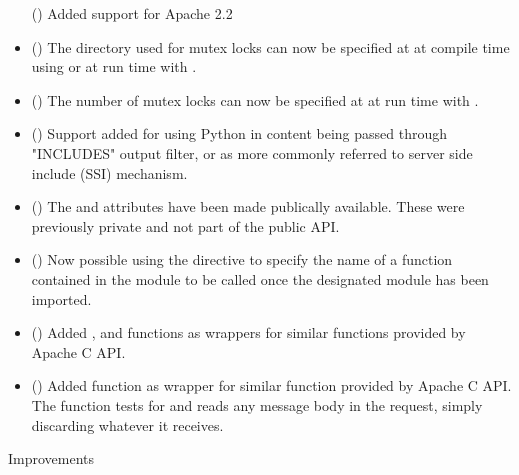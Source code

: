 \begin{itemize}
      ()
      Added support for Apache 2.2
    \item
      ()
      The directory used for mutex locks can now be specified at 
      at compile time using 
      or at run time with .
    \item
      ()
      The number of mutex locks can now be specified at at run time with
      .
    \item
      ()
      Support added for using Python in content being passed through "INCLUDES"
      output filter, or as more commonly referred to server side include (SSI)
      mechanism.
    \item
      ()
      The  and  attributes
      have been made publically available. These were previously private and
      not part of the public API.
    \item
      ()
      Now possible using the  directive to specify the name
      of a function contained in the module to be called once the designated
      module has been imported.
    \item
      ()
      Added ,  and
       functions as wrappers for similar functions
      provided by Apache C API.
    \item
      ()
      Added  function as wrapper for
      similar function provided by Apache C API. The function tests for
      and reads any message body in the request, simply discarding
      whatever it receives.
  \end{itemize}

  Improvements

